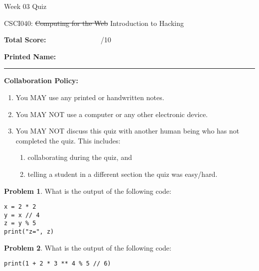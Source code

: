 \documentclass[10pt]{article}
\theoremstyle{definition}
\newtheorem{problem}{Problem}
\begin{document}
\begin{center}
    {
\Large
    Week 03 Quiz
}

    \vspace{0.1in}
    CSCI040: \sout{Computing for the Web} Introduction to Hacking

    \vspace{0.1in}
\end{center}

\vspace{0.15in}
\noindent
\textbf{Total Score:} ~~~~~~~~~~~~~~~/10

\vspace{0.5in}
\noindent
\textbf{Printed Name:}

\noindent
\rule{\textwidth}{0.1pt}
\vspace{0.25in}

\noindent
\textbf{Collaboration Policy:}
\begin{enumerate}
    \item You MAY use any printed or handwritten notes.
    \item You MAY NOT use a computer or any other electronic device.
    \item You MAY NOT discuss this quiz with another human being who has not completed the quiz.
        This includes:
        \begin{enumerate}
            \item collaborating during the quiz, and
            \item telling a student in a different section the quiz was easy/hard.
        \end{enumerate}
\end{enumerate}

\vspace{0.15in}

\begin{problem}
    What is the output of the following code:
\end{problem}
\begin{lstlisting}
x = 2 * 2 
y = x // 4
z = y % 5
print("z=", z)
\end{lstlisting}
\vspace{1.5in}

\begin{problem}
    What is the output of the following code:
\end{problem}
\begin{lstlisting}
print(1 + 2 * 3 ** 4 % 5 // 6)
\end{lstlisting}
\vspace{1.5in}
\end{document}
